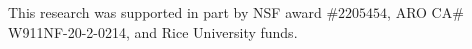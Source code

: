 

\begin{acks}
This research was supported in part by NSF award $\#2205454$, ARO CA\# W911NF-20-2-0214, and Rice University funds.
\end{acks}